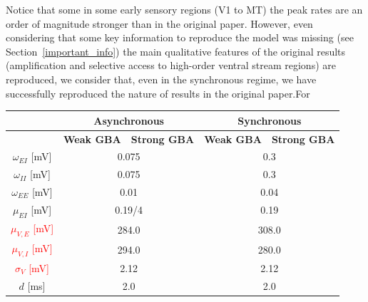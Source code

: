 Notice that some in some early sensory regions (V1 to MT) the peak rates are an order of magnitude stronger than in the original paper. However, even considering that some key information to reproduce the model was missing (see Section~\ref{important_info}) the main qualitative features of the original results (amplification and selective access to high-order ventral stream regions) are reproduced, we consider that, even in the synchronous regime, we have successfully reproduced the nature of results in the original paper.For

\begin{table}[!ht]
\centering
\begin{tabular}{c|c|c|c|c|}
\cline{2-5}
\multicolumn{1}{l|}{}                                    & \multicolumn{2}{c|}{\textbf{Asynchronous}} &  \multicolumn{2}{c|}{\textbf{Synchronous}} \\ \hline 
\multicolumn{1}{|c|}{}                                   & \textbf{Weak GBA}   & \textbf{Strong GBA}  & \textbf{Weak GBA}  & \textbf{Strong GBA}  \\ \hline
\multicolumn{1}{|c|}{$\omega_{EI}$ {[}mV{]}}             & \multicolumn{2}{c|}{0.075}                 & \multicolumn{2}{c|}{0.3}                  \\ \hline
\multicolumn{1}{|c|}{$\omega_{II}$ {[}mV{]}}             & \multicolumn{2}{c|}{0.075}                 & \multicolumn{2}{c|}{0.3}                  \\ \hline
\multicolumn{1}{|c|}{$\omega_{EE}$ {[}mV{]}}             & \multicolumn{2}{c|}{0.01}                  & \multicolumn{2}{c|}{0.04}                 \\ \hline
\multicolumn{1}{|c|}{$\mu_{EI}$ {[}mV{]}}                & \multicolumn{2}{c|}{0.19/4}                & \multicolumn{2}{c|}{0.19}                 \\ \hline
\multicolumn{1}{|c|}{\textcolor{red}{$\mu_{V,E}$ {[}mV{]}}}               & \multicolumn{2}{c|}{284.0}                 & \multicolumn{2}{c|}{308.0}                \\ \hline
\multicolumn{1}{|c|}{\textcolor{red}{$\mu_{V,I}$ {[}mV{]}}}               & \multicolumn{2}{c|}{294.0}                 & \multicolumn{2}{c|}{280.0}                \\ \hline
\multicolumn{1}{|c|}{\textcolor{red}{$\sigma_V$ {[}mV{]}}}                & \multicolumn{2}{c|}{2.12}                  & \multicolumn{2}{c|}{2.12}                 \\ \hline
\multicolumn{1}{|c|}{$d$ {[}ms{]}}                       & \multicolumn{2}{c|}{2.0}                   & \multicolumn{2}{c|}{2.0}                  \\ \hline

\end{tabular}
\end{table}
